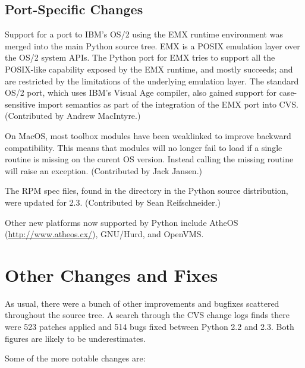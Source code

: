 \documentclass{howto}
\begin{document}
\subsection{Port-Specific Changes}

Support for a port to IBM's OS/2 using the EMX runtime environment was
merged into the main Python source tree.  EMX is a POSIX emulation
layer over the OS/2 system APIs.  The Python port for EMX tries to
support all the POSIX-like capability exposed by the EMX runtime, and
mostly succeeds;  and  are
restricted by the limitations of the underlying emulation layer.  The
standard OS/2 port, which uses IBM's Visual Age compiler, also gained
support for case-sensitive import semantics as part of the integration
of the EMX port into CVS.  (Contributed by Andrew MacIntyre.)

On MacOS, most toolbox modules have been weaklinked to improve
backward compatibility.  This means that modules will no longer fail
to load if a single routine is missing on the curent OS version.
Instead calling the missing routine will raise an exception.
(Contributed by Jack Jansen.)

The RPM spec files, found in the  directory in the
Python source distribution, were updated for 2.3.  (Contributed by
Sean Reifschneider.)

Other new platforms now supported by Python include AtheOS
(\url{http://www.atheos.cx/}), GNU/Hurd, and OpenVMS.


\section{Other Changes and Fixes \label{section-other}}

As usual, there were a bunch of other improvements and bugfixes
scattered throughout the source tree.  A search through the CVS change
logs finds there were 523 patches applied and 514 bugs fixed between
Python 2.2 and 2.3.  Both figures are likely to be underestimates.

Some of the more notable changes are:
\end{document}
